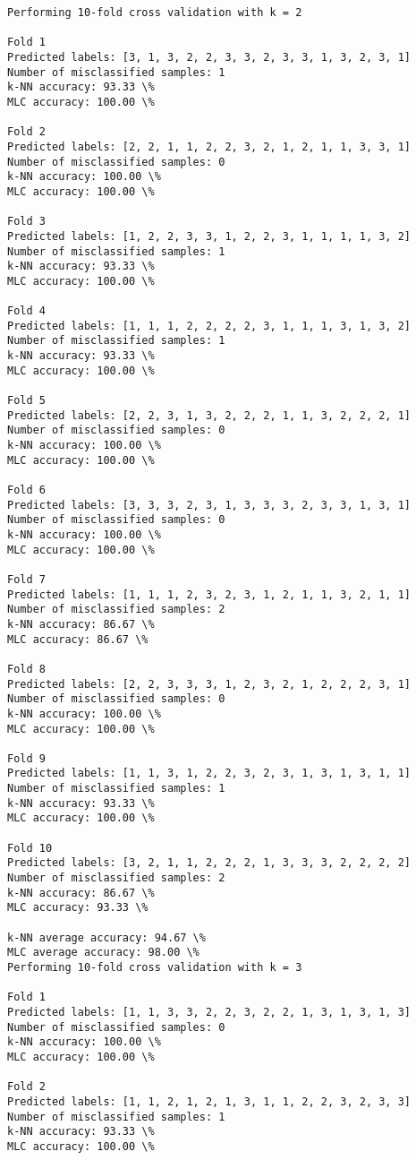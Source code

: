 \documentclass[11pt]{article}
\begin{document}
    \begin{Verbatim}[commandchars=\\\{\}]
Performing 10-fold cross validation with k = 2

Fold 1
Predicted labels: [3, 1, 3, 2, 2, 3, 3, 2, 3, 3, 1, 3, 2, 3, 1]
Number of misclassified samples: 1
k-NN accuracy: 93.33 \%
MLC accuracy: 100.00 \%

Fold 2
Predicted labels: [2, 2, 1, 1, 2, 2, 3, 2, 1, 2, 1, 1, 3, 3, 1]
Number of misclassified samples: 0
k-NN accuracy: 100.00 \%
MLC accuracy: 100.00 \%

Fold 3
Predicted labels: [1, 2, 2, 3, 3, 1, 2, 2, 3, 1, 1, 1, 1, 3, 2]
Number of misclassified samples: 1
k-NN accuracy: 93.33 \%
MLC accuracy: 100.00 \%

Fold 4
Predicted labels: [1, 1, 1, 2, 2, 2, 2, 3, 1, 1, 1, 3, 1, 3, 2]
Number of misclassified samples: 1
k-NN accuracy: 93.33 \%
MLC accuracy: 100.00 \%

Fold 5
Predicted labels: [2, 2, 3, 1, 3, 2, 2, 2, 1, 1, 3, 2, 2, 2, 1]
Number of misclassified samples: 0
k-NN accuracy: 100.00 \%
MLC accuracy: 100.00 \%

Fold 6
Predicted labels: [3, 3, 3, 2, 3, 1, 3, 3, 3, 2, 3, 3, 1, 3, 1]
Number of misclassified samples: 0
k-NN accuracy: 100.00 \%
MLC accuracy: 100.00 \%

Fold 7
Predicted labels: [1, 1, 1, 2, 3, 2, 3, 1, 2, 1, 1, 3, 2, 1, 1]
Number of misclassified samples: 2
k-NN accuracy: 86.67 \%
MLC accuracy: 86.67 \%

Fold 8
Predicted labels: [2, 2, 3, 3, 3, 1, 2, 3, 2, 1, 2, 2, 2, 3, 1]
Number of misclassified samples: 0
k-NN accuracy: 100.00 \%
MLC accuracy: 100.00 \%

Fold 9
Predicted labels: [1, 1, 3, 1, 2, 2, 3, 2, 3, 1, 3, 1, 3, 1, 1]
Number of misclassified samples: 1
k-NN accuracy: 93.33 \%
MLC accuracy: 100.00 \%

Fold 10
Predicted labels: [3, 2, 1, 1, 2, 2, 2, 1, 3, 3, 3, 2, 2, 2, 2]
Number of misclassified samples: 2
k-NN accuracy: 86.67 \%
MLC accuracy: 93.33 \%

k-NN average accuracy: 94.67 \%
MLC average accuracy: 98.00 \%
Performing 10-fold cross validation with k = 3

Fold 1
Predicted labels: [1, 1, 3, 3, 2, 2, 3, 2, 2, 1, 3, 1, 3, 1, 3]
Number of misclassified samples: 0
k-NN accuracy: 100.00 \%
MLC accuracy: 100.00 \%

Fold 2
Predicted labels: [1, 1, 2, 1, 2, 1, 3, 1, 1, 2, 2, 3, 2, 3, 3]
Number of misclassified samples: 1
k-NN accuracy: 93.33 \%
MLC accuracy: 100.00 \%


\end{Verbatim}
\end{document}
